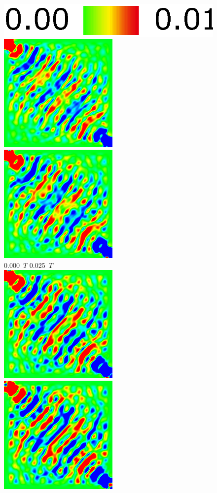 \documentclass[a4j, twocolumn]{jsarticle}
\begin{document}
\begin{figure}
\centering
\includegraphics[width=0.4\hsize]{./figures/colorbar_001.eps} \\
\includegraphics[width=0.4\hsize]{./figures/capture/sqr/sinsqr128_32i_l_dif_7060} \ 
\includegraphics[width=0.4\hsize]{./figures/capture/sqr/sinsqr128_32i_l_dif_7061} \\
0.000\ $T$ \hspace*{0.25\hsize} 0.025\ $T$  \vspace{5pt}\\
\includegraphics[width=0.4\hsize]{./figures/capture/sqr/sinsqr128_32i_l_dif_7062} \ 
\includegraphics[width=0.4\hsize]{./figures/capture/sqr/sinsqr128_32i_l_dif_7063} \\

\end{figure}
\end{document}
